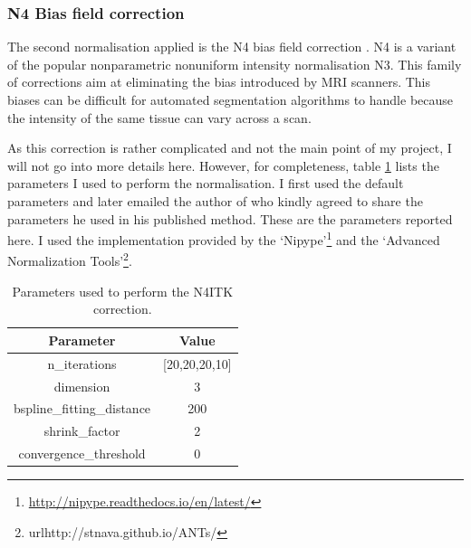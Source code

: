 \documentclass[12pt,a4paper,twoside,openright]{report}
\begin{document}
\subsubsection{N4 Bias field correction}
The second normalisation applied is the N4 bias field correction \cite{n4itk}. N4 is a variant of the popular nonparametric nonuniform intensity normalisation N3. This family of corrections aim at eliminating the bias introduced by MRI scanners. This biases can be difficult for automated segmentation algorithms to handle because the intensity of the same tissue can vary across a scan. 

As this correction is rather complicated and not the main point of my project, I will not go into more details here. However, for completeness, table \ref{table:n4_params} lists the parameters I used to perform the normalisation. I first used the default parameters and later emailed the author of \cite{pereira} who kindly agreed to share the parameters he used in his published method. These are the parameters reported here. I used the implementation provided by the `Nipype'\footnote{\url{http://nipype.readthedocs.io/en/latest/}} and the `Advanced Normalization Tools'\footnote{url{http://stnava.github.io/ANTs/}}.

\begin{table}[h]
\centering	
\label{table:n4_params}
\begin{tabular}{ c c } 
\textbf{Parameter} & \textbf{Value} \\
 \hline
 n\_iterations & [20,20,20,10] \\ 
 dimension & 3 \\
 bspline\_fitting\_distance & 200 \\
 shrink\_factor & 2\\
 convergence\_threshold & 0
\end{tabular}
\caption{Parameters used to perform the N4ITK correction.}
\end{table}
\end{document}
